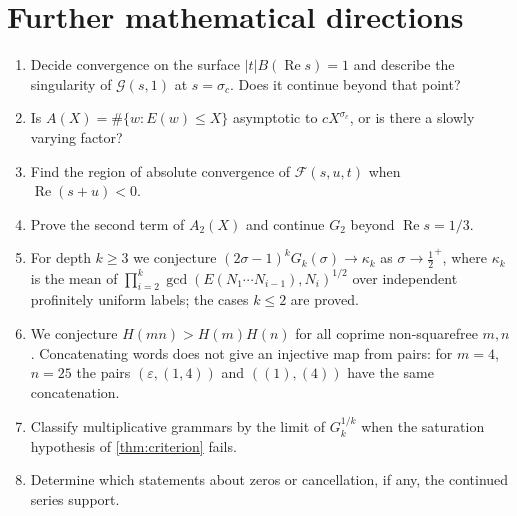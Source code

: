 \documentclass[11pt,a4paper]{article}
\begin{document}
\section{Further mathematical directions}
\begin{enumerate}
\item Decide convergence on the surface $|t|B(\operatorname{Re}s)=1$ and describe the singularity of
$\mathcal G(s,1)$ at $s=\sigma_c$. Does it continue beyond that point?
\item Is $A(X)=\#\{w:E(w)\le X\}$ asymptotic to $cX^{\sigma_c}$, or is there a slowly varying factor?
\item Find the region of absolute convergence of $\mathcal F(s,u,t)$ when $\operatorname{Re}(s+u)<0$.
\item Prove the second term of $A_2(X)$ and continue $G_2$ beyond $\operatorname{Re}s=1/3$.
\item For depth $k\ge3$ we conjecture $(2\sigma-1)^kG_k(\sigma)\to\kappa_k$ as $\sigma\to\tfrac12^+$, where
$\kappa_k$ is the mean of $\prod_{i=2}^k\gcd(E(N_1\cdots N_{i-1}),N_i)^{1/2}$ over independent profinitely
uniform labels; the cases $k\le2$ are proved.
\item We conjecture $H(mn)>H(m)H(n)$ for all coprime non-squarefree $m,n$. Concatenating words does not give an
injective map from pairs: for $m=4$, $n=25$ the pairs $(\varepsilon,(1,4))$ and $((1),(4))$ have the same
concatenation.
\item Classify multiplicative grammars by the limit of $G_k^{1/k}$ when the saturation hypothesis of
\cref{thm:criterion} fails.
\item Determine which statements about zeros or cancellation, if any, the continued series support.
\end{enumerate}

\appendix
\end{document}
